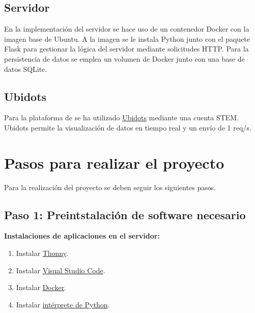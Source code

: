 \documentclass{article}
\begin{document}
\subsection{Servidor}
En la implementación del servidor se hace uso de un contenedor Docker con la imagen base de Ubuntu. A la imagen se le instala Python junto con el paquete Flask para gestionar la lógica del servidor mediante solicitudes HTTP. Para la persistencia de datos se emplea un volumen de Docker junto con una base de datos SQLite.


\subsection{Ubidots}
Para la plataforma de se ha utilizado \href{https://stem.ubidots.com/}{Ubidots} mediante una cuenta STEM. Ubidots permite la visualización de datos en tiempo real y un envío de 1 req/s.

\section{Pasos para realizar el proyecto}
Para la realización del proyecto se deben seguir los siguientes pasos.
\subsection{Paso 1: Preintstalación de software necesario}
\textbf{Instalaciones de aplicaciones en el servidor:}
\begin{enumerate}
    \item Instalar \href{https://thonny.org/}{Thonny}.
    \item Instalar \href{https://code.visualstudio.com/download}{Visual Studio Code}.
    \item Instalar \href{https://docs.docker.com/get-docker/}{Docker}.
    \item Instalar \href{https://kinsta.com/es/base-de-conocimiento/instalar-python/}{intérprete de Python}.
\end{enumerate}
\end{document}
